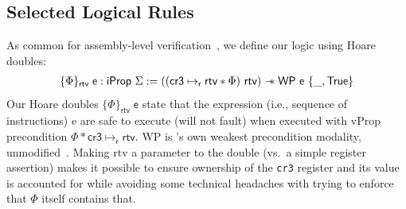 \subsection{Selected Logical Rules}
\label{sec:selected_rules}
As common for assembly-level verification~, we define our logic using Hoare doubles:%
  \[
  \begin{array}{l}
    \{ \Phi \}_\mathsf{ rtv }\;\textsf{e} : \textsf{iProp }\Sigma := 
   ((\textsf{cr3} \mapsto_{\textsf{r}} \textsf{rtv} \ast \Phi) \textsf{ rtv}) \mathrel{-\!\!\ast} \textsf{WP e } \{\_, \textsf{True} \}
    \end{array}
  \]
Our Hoare doubles $\{\Phi\}_\textsf{rtv}\;\textsf{e}$ state that the expression (i.e., sequence of instructions)
\textsf{e} are safe to execute (will not fault)
when executed with \textsf{vProp} precondition $\Phi\ast\textsf{cr3}\mapsto_{\textsf{r}} \textsf{rtv}$.
\textsf{WP} is \iris's own weakest precondition modality, unmodified~\cite{jung2018iris}.
Making \textsf{rtv} a parameter to the double (vs.\ a simple register assertion)
makes it possible to ensure ownership of the \lstinline|cr3| register and its value is accounted for
while avoiding some technical headaches with trying to enforce that $\Phi$ itself contains that.

